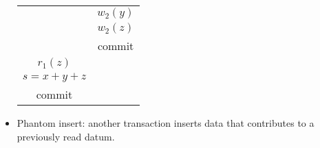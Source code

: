\begin{itemize}
\begin{table}[H]
\begin{tabular}{c|c}
                                        & $w_2(y)$                   \\
                                        & $w_2(z)$                   \\
                                        & commit                     \\
            $r_1(z)$                   &                            \\
            $s=x+y+z$                  &                            \\
            commit                     &                           
            \end{tabular}
        \end{table}
    \item Phantom insert: another transaction inserts data that contributes to a previously read datum.
\end{itemize}